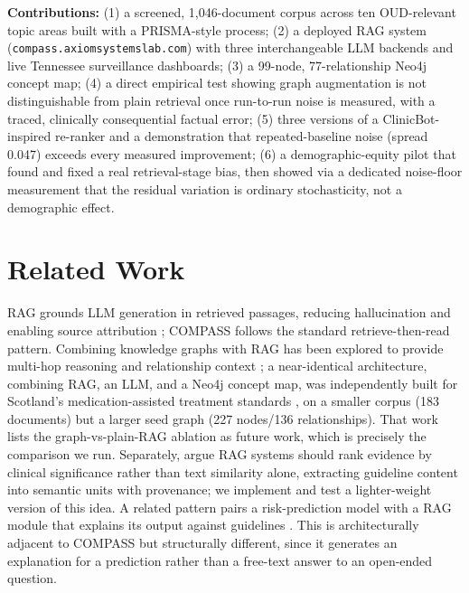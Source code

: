 \documentclass[letterpaper]{article}
\begin{document}
\textbf{Contributions:} (1) a screened, 1{,}046-document corpus across ten OUD-relevant topic areas built with a PRISMA-style process; (2) a deployed RAG system (\texttt{compass.axiomsystemslab.com}) with three interchangeable LLM backends and live Tennessee surveillance dashboards; (3) a 99-node, 77-relationship Neo4j concept map; (4) a direct empirical test showing graph augmentation is not distinguishable from plain retrieval once run-to-run noise is measured, with a traced, clinically consequential factual error; (5) three versions of a ClinicBot-inspired re-ranker and a demonstration that repeated-baseline noise (spread 0.047) exceeds every measured improvement; (6) a demographic-equity pilot that found and fixed a real retrieval-stage bias, then showed via a dedicated noise-floor measurement that the residual variation is ordinary stochasticity, not a demographic effect.

\section{Related Work}

RAG grounds LLM generation in retrieved passages, reducing hallucination and enabling source attribution \citep{lewis2020rag,gao2023ragsurvey}; COMPASS follows the standard retrieve-then-read pattern. Combining knowledge graphs with RAG has been explored to provide multi-hop reasoning and relationship context \citep{edge2024graphrag}; a near-identical architecture, combining RAG, an LLM, and a Neo4j concept map, was independently built for Scotland's medication-assisted treatment standards \citep{scotlandmat2026}, on a smaller corpus (183 documents) but a larger seed graph (227 nodes/136 relationships). That work lists the graph-vs-plain-RAG ablation as future work, which is precisely the comparison we run. Separately, \citet{clinicbot2026} argue RAG systems should rank evidence by clinical significance rather than text similarity alone, extracting guideline content into semantic units with provenance; we implement and test a lighter-weight version of this idea. A related pattern pairs a risk-prediction model with a RAG module that explains its output against guidelines \citep{bakshi2026}. This is architecturally adjacent to COMPASS but structurally different, since it generates an explanation for a prediction rather than a free-text answer to an open-ended question.
\end{document}
